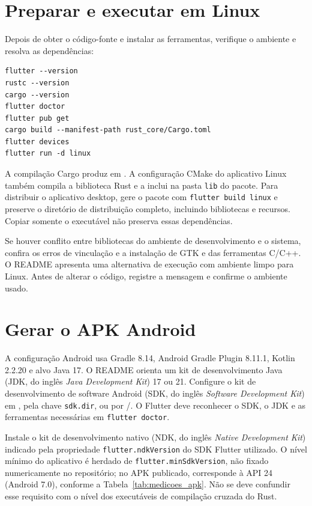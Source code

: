 \section*{Preparar e executar em Linux}

Depois de obter o código-fonte e instalar as ferramentas, verifique o ambiente
e resolva as dependências:

\begin{lstlisting}[language={},numbers=none]
flutter --version
rustc --version
cargo --version
flutter doctor
flutter pub get
cargo build --manifest-path rust_core/Cargo.toml
flutter devices
flutter run -d linux
\end{lstlisting}

A compilação Cargo produz  em
. A configuração CMake do aplicativo Linux
também compila a biblioteca Rust e a inclui na pasta \texttt{lib} do pacote.
Para distribuir o aplicativo desktop, gere o pacote com
\texttt{flutter build linux} e preserve o diretório de distribuição completo,
incluindo bibliotecas e recursos. Copiar somente o executável não preserva
essas dependências.

Se houver conflito entre bibliotecas do ambiente de desenvolvimento e o sistema,
confira os erros de vinculação e a instalação de GTK e das ferramentas C/C++.
O README apresenta uma alternativa de execução com ambiente limpo para Linux.
Antes de alterar o código, registre a mensagem e confirme o ambiente usado.

\section*{Gerar o APK Android}

A configuração Android usa Gradle 8.14, Android Gradle Plugin 8.11.1, Kotlin
2.2.20 e alvo Java 17. O README orienta um kit de desenvolvimento Java (JDK, do inglês \textit{Java Development Kit}) 17 ou 21. Configure o kit de desenvolvimento de software Android (SDK, do inglês \textit{Software Development Kit})
em , pela chave \texttt{sdk.dir}, ou por
/. O Flutter deve reconhecer
o SDK, o JDK e as ferramentas necessárias em \texttt{flutter doctor}.

Instale o kit de desenvolvimento nativo (NDK, do inglês \textit{Native Development Kit}) indicado pela propriedade \texttt{flutter.ndkVersion} do SDK
Flutter utilizado. O nível mínimo do aplicativo é herdado de
\texttt{flutter.minSdkVersion}, não fixado numericamente no repositório; no APK
publicado, corresponde à API 24 (Android 7.0), conforme a
Tabela~\ref{tab:medicoes_apk}. Não se deve confundir esse requisito com o nível
dos executáveis de compilação cruzada do Rust.

